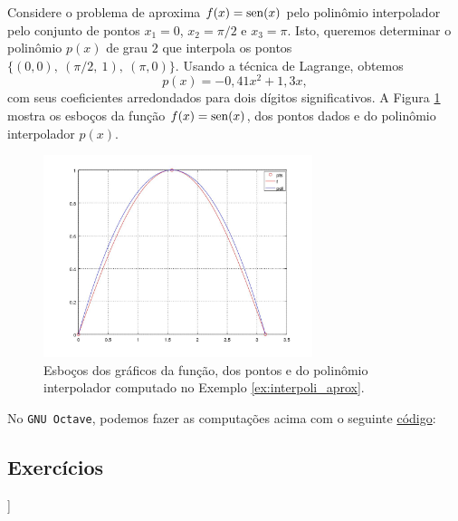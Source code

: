 \begin{ex}\label{ex:interpoli_aprox}
  Considere o problema de aproxima $f(x) = \operatorname{sen}(x)$ pelo polinômio interpolador pelo conjunto de pontos $x_1=0$, $x_2=\pi/2$ e $x_3=\pi$. Isto, queremos determinar o polinômio $p(x)$ de grau $2$ que interpola os pontos $\{(0,0),~(\pi/2,~1),~(\pi,0)\}$. Usando a técnica de Lagrange, obtemos
  \begin{equation}
    p(x) = -0,41x^2 + 1,3x,
  \end{equation}
com seus coeficientes arredondados para dois dígitos significativos. A Figura \ref{fig:interpoli_aprox} mostra os esboços da função $f(x)=\operatorname{sen}(x)$, dos pontos dados e do polinômio interpolador $p(x)$.

\begin{figure}[h!]
  \centering
  \includegraphics[width=0.7\textwidth]{./cap_interp/dados/ex_interpoli_aprox/fig_interpoli_aprox}
  \caption{Esboços dos gráficos da função, dos pontos e do polinômio interpolador computado no Exemplo \ref{ex:interpoli_aprox}.}
  \label{fig:interpoli_aprox}
\end{figure}

\ifisoctave
No \verb+GNU Octave+, podemos fazer as computações acima com o seguinte \href{https://github.com/phkonzen/notas/blob/master/src/MatematicaNumerica/cap_interp/dados/ex_interpoli_aprox/ex_interpoli_aprox.m}{código}:

\fi
\end{ex}

\subsection*{Exercícios}

\begin{flushleft}
  [[tag:revisar]]
\end{flushleft}

